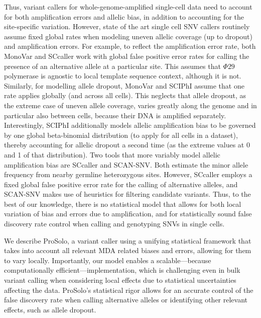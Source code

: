 \documentclass[12pt,inline]{wlscirep}
\begin{document}
Thus, variant callers for whole-genome-amplified single-cell data need to account for both amplification errors and allelic bias, in addition to accounting for the site-specific variation.
However, state of the art single cell SNV callers routinely assume fixed global rates when modeling uneven allelic coverage (up to dropout) and amplification errors. 
For example, to reflect the amplification error rate, both MonoVar\cite{zafar_monovar:_2016} and SCcaller\cite{dong_accurate_2017} work with global false positive error rates for calling the presence of an alternative allele at a particular site.
This assumes that $\Phi29$ polymerase is agnostic to local template sequence context, although it is not\cite{de_paz_high-resolution_2018}.
Similarly, for modelling allele dropout, MonoVar\cite{zafar_monovar:_2016} and SCIPhI\cite{singer_single-cell_2018} assume that one rate applies globally (and across all cells).
This neglects that allele dropout, as the extreme case of uneven allele coverage, varies greatly along the genome and in particular also between cells, because their DNA is amplified separately.
Interestingly, SCIPhI\cite{singer_single-cell_2018} additionally models allelic amplification bias to be governed by one global beta-binomial distribution (to apply for all cells in a dataset), thereby accounting for allelic dropout a second time (as the extreme values at 0 and 1 of that distribution).
Two tools that more variably model allelic amplification bias are SCcaller \cite{dong_accurate_2017} and SCAN-SNV\cite{luquette_identification_2019}.
Both estimate the minor allele frequency from nearby germline heterozygous sites. 
However, SCcaller employs a fixed global false positive error rate for the calling of alternative alleles\cite{dong_accurate_2017}, and SCAN-SNV makes use of heuristics for filtering candidate variants\cite{luquette_identification_2019}.
Thus, to the best of our knowledge, there is no statistical model that allows for both local variation of bias and errors due to amplification, and for statistically sound false discovery rate control when calling and genotyping SNVs in single cells.

We describe ProSolo, a variant caller using a unifying statistical framework that takes into account all relevant MDA related biases and errors, allowing for them to vary locally.
Importantly, our model enables a scalable---because computationally efficient---implementation, which is challenging even in bulk variant calling when considering local effects due to statistical uncertainties affecting the data\cite{koster_varlociraptor_2020}.
ProSolo's statistical rigor allows for an accurate control of the false discovery rate when calling alternative alleles or identifying other relevant effects, such as allele dropout.
\end{document}
